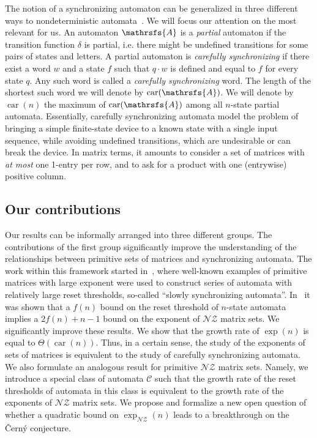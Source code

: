 \documentclass[a4paper,USenglish]{lipics}
\DeclareMathOperator{\car}{car}
\theoremstyle{definition}
\begin{document}
The notion of a synchronizing automaton can be generalized in three different ways to nondeterministic automata~\cite{ImSt99}. We will focus our attention on the most relevant for us. An automaton $\mathrsfs{A}$ is a \emph{partial} automaton if the transition function $\delta$ is partial, i.e. there might be undefined transitions for some pairs of states and letters. A partial automaton is \emph{carefully synchronizing} if there exist a word $w$ and a state $f$ such that $q\cdot w$ is defined and equal to $f$ for every state $q$. Any such word is called a \emph{carefully synchronizing} word. The length of the shortest such word we will denote by $\car (\mathrsfs{A})$.
We will denote by $\car(n)$ the maximum of $\car(\mathrsfs{A})$ among all $n$-state partial automata. Essentially, carefully synchronizing automata model the problem of bringing a simple finite-state device to a known state with a single input sequence, while avoiding undefined transitions, which are undesirable or can break the device. In matrix terms, it amounts to consider a set of matrices with \emph{at most} one 1-entry per row, and to ask for a product with one (entrywise) positive column.


\subsection{Our contributions}
Our results can be informally arranged into three different groups. The contributions of the first group significantly improve the understanding of the relationships between primitive sets of matrices and synchronizing automata. The work within this framework started in~\cite{AGV2013}, where well-known examples of primitive matrices with large exponent were used to construct series of automata with relatively large reset thresholds, so-called ``slowly synchronizing automata''. In~\cite{BJO15} it was shown that a $f(n)$ bound on the reset threshold of $n$-state automata implies a $2f(n)+n-1$ bound on the exponent of $\mathscr{NZ}$ matrix sets. We significantly improve these results. We show that the growth rate of $\exp(n)$ is equal to $\Theta(\car(n))$. Thus, in a certain sense, the study of the exponents of sets of matrices is equivalent to the study of carefully synchronizing automata. We also formulate an analogous result for primitive $\mathscr{NZ}$ matrix sets. Namely, we introduce a special class of automata $\mathscr{C}$ such that the growth rate of the reset thresholds of automata in this class is equivalent to the growth rate of the exponents of $\mathscr{NZ}$ matrix sets. We propose and formalize a new open question of whether a quadratic bound on $\exp_{\mathscr{NZ}}(n)$ leads to a breakthrough on the \v{C}ern\'{y} conjecture.
\end{document}
